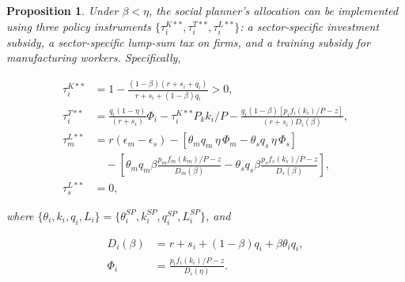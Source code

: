 \documentclass[12pt]{article} %
\newtheorem{proposition}{Proposition}
\theoremstyle{definition}
\begin{document}



\begin{proposition} \label{prop:small_beta}
Under $\beta<\eta$, the social planner's allocation can be implemented using three policy instruments $\{\tau^{K**}_i, \tau^{T**}_i, \tau^{L**}_i\}$: a sector-specific investment subsidy, a sector-specific lump-sum tax on firms, and a training subsidy for manufacturing workers. Specifically, 


    
\begin{align}
     \tau^{K**}_i &= 1- \frac{(1-\beta)(r+s_i+q_i)}{r+s_i+(1-\beta)q_i} >0,\\
  \tau^{T**}_i      &=  \frac{q_i(1-\eta)}{(r+s_i)}\Phi_i - \tau^{K**}_iP_kk_i/P - \frac{q_i(1-\beta)[p_if_i(k_i)/P-z]}{(r+s_i)D_i(\beta)},  \\
   \tau^{L**}_m & =   r(\epsilon_m-\epsilon_s) -  [\theta_m q_m \,\eta\, \Phi_m-  \theta_s q_s\,\eta\, \Phi_s]  \\
   & \quad - [ \theta_mq_m\beta \frac{p_mf_m(k_m)/P-z}{D_m(\beta)}   
   -\theta_sq_s\beta \frac{p_sf_s(k_s)/P-z}{D_s(\beta)}],\\
      \tau^{L**}_s&=0,
\end{align}

where    $\{\theta_i, k_i, q_i, L_i\} = \{\theta_i^{SP}, k_i^{SP}, q_i^{SP}, L_i^{SP}\}$,  and

\begin{align*}
    D_i(\beta)&= r+s_i+(1-\beta)q_i+\beta\theta_iq_i, \\
    \Phi_i & = \frac{p_if_i(k_i)/P-z}{D_i(\eta)}.
\end{align*}


\end{proposition}


\end{document}
